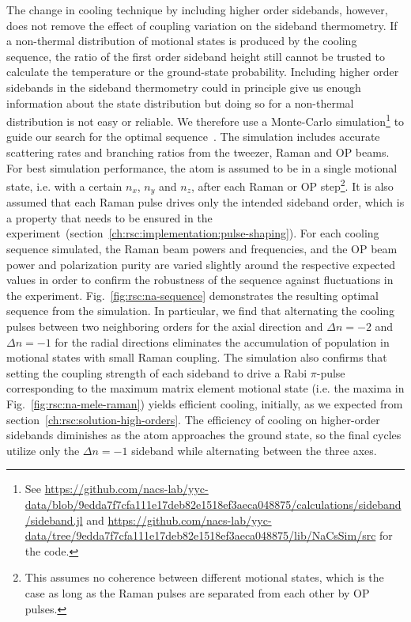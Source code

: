 The change in cooling technique by including higher order sidebands, however,
does not remove the effect of coupling variation on the sideband thermometry.
If a non-thermal distribution of motional states is produced by the cooling sequence,
the ratio of the first order sideband height still cannot be trusted to calculate
the temperature or the ground-state probability.
Including higher order sidebands in the sideband thermometry could in principle
give us enough information about the state distribution but doing
so for a non-thermal distribution is not easy or reliable.
We therefore use a Monte-Carlo simulation\footnote{
  See \url{https://github.com/nacs-lab/yyc-data/blob/9edda7f7cfa111e17deb82e1518ef3aeca048875/calculations/sideband/sideband.jl} and \url{https://github.com/nacs-lab/yyc-data/tree/9edda7f7cfa111e17deb82e1518ef3aeca048875/lib/NaCsSim/src} for the code.
} to guide our search
for the optimal sequence~\cite{dalibard_wave-function_1992,chretien_laser_2014}.
The simulation includes accurate scattering rates and branching ratios
from the tweezer, Raman and OP beams.
For best simulation performance, the atom is assumed to be in a single motional state,
i.e. with a certain $n_x$, $n_y$ and $n_z$, after each Raman or OP step\footnote{
  This assumes no coherence between different motional states,
  which is the case as long as the Raman pulses are separated from each other by OP pulses.}.
It is also assumed that each Raman pulse drives only the intended sideband order,
which is a property that needs to be ensured
in the experiment~(section~\ref{ch:rsc:implementation:pulse-shaping}).
For each cooling sequence simulated,
the Raman beam powers and frequencies, and the OP beam power and polarization purity
are varied slightly around the respective expected values
in order to confirm the robustness of the sequence against fluctuations in the experiment.
Fig.~\ref{fig:rsc:na-sequence} demonstrates the resulting optimal sequence from the simulation.
In particular, we find that alternating the cooling pulses between two
neighboring orders for the axial direction and $\Delta n=-2$ and $\Delta n=-1$
for the radial directions
eliminates the accumulation of population in motional states with small Raman coupling.
The simulation also confirms that setting the coupling strength of each sideband
to drive a Rabi $\pi$-pulse corresponding to the maximum matrix element motional state
(i.e. the maxima in Fig.~\ref{fig:rsc:na-mele-raman}) yields efficient cooling, initially,
as we expected from section~\ref{ch:rsc:solution-high-orders}.
The efficiency of cooling on higher-order sidebands diminishes
as the atom approaches the ground state, so the final cycles utilize only
the $\Delta n=-1$ sideband while alternating between the three axes.

